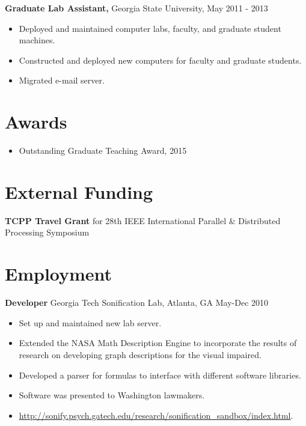 \documentclass{res}
\begin{document}
\begin{resume}
\begin{itemize}
     \end{itemize}   
     
{\bf Graduate Lab Assistant,} Georgia State University, May 2011 - 2013
     \begin{itemize}
     \item Deployed and maintained computer labs, faculty, and graduate student machines.
     \item Constructed and deployed new computers for faculty and graduate students.
     \item Migrated e-mail server.
     \end{itemize}
     

\section{Awards}
\begin{itemize}    
	\item Outstanding Graduate Teaching Award, 2015
\end{itemize}   

\section{External Funding}
\textbf{TCPP Travel Grant} for 28th IEEE International Parallel \& Distributed Processing Symposium




\section{Employment}
% 
{\bf Developer} Georgia Tech Sonification Lab, Atlanta, GA May-Dec 2010
	\begin{itemize}
		\item Set up and maintained new lab server.
		\item Extended the NASA Math Description Engine to incorporate the results of research on developing graph descriptions for the visual impaired.
		\item Developed a parser for formulas to interface with different software libraries.
		\item Software was presented to Washington lawmakers.
		\item \url{http://sonify.psych.gatech.edu/research/sonification_sandbox/index.html}.
    \end{itemize}      
    

\end{resume}
\end{document}

